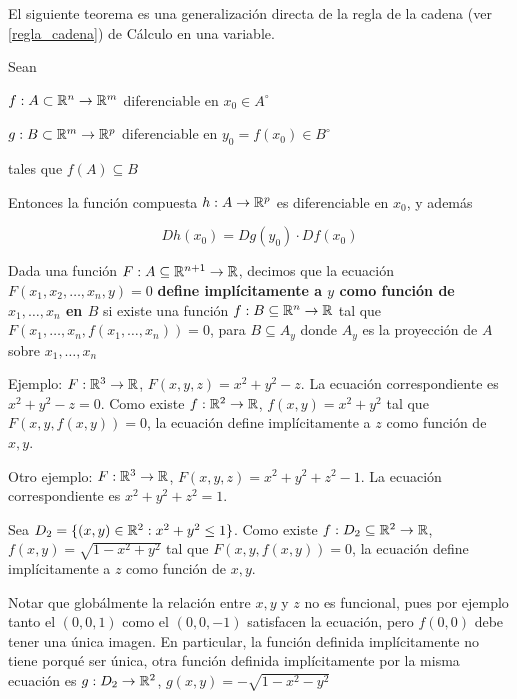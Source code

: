 El siguiente teorema es una generalización directa de la regla de la cadena (ver \ref{regla_cadena}) de Cálculo en una variable.

\begin{theorem} \label{regla_cadena_matricial} 
Sean

$ f : A \subset \mathbb{R}^n \to \mathbb{R}^m$ diferenciable en $x_0 \in A^{\circ}$

$ g : B \subset \mathbb{R}^m \to \mathbb{R}^p$ diferenciable en $y_0 = f(x_0) \in B^{\circ}$

tales que $f(A) \subseteq B$

Entonces la función compuesta $h : A \to \mathbb{R}^p$ es diferenciable en $x_0$, y además 

$$ Dh(x_0) = Dg(y_0) \cdot Df(x_0) $$
\end{theorem}

\begin{definition}
Dada una función $F : A \subseteq \mathbb{R}^{n+1} \to \mathbb{R}$, decimos que la ecuación $F(x_1, x_2, \ldots, x_n, y) = 0$ \textbf{define implícitamente a $y$ como función de $x_1, \ldots, x_n$ en $B$} si existe una función $ f : B \subseteq \mathbb{R}^n \to \mathbb{R}$ tal que $F(x_1, \ldots, x_n, f(x_1, \ldots, x_n)) = 0$, para $B \subseteq A_y$ donde $A_y$ es la proyección de $A$ sobre $x_1, \ldots, x_n$
\end{definition}

Ejemplo: $F: \mathbb{R}^3 \to \mathbb{R}$, $F(x,y,z) = x^2 + y^2 - z$.  La ecuación correspondiente es $x^2 + y^2 - z = 0$. Como existe $f : \mathbb{R}^2 \to \mathbb{R}$, $f(x,y) = x^2 + y^2$ tal que $F(x,y,f(x,y)) = 0$, la ecuación define implícitamente a $z$ como función de $x,y$.

Otro ejemplo: $F: \mathbb{R}^3 \to \mathbb{R}$, $F(x,y,z) = x^2 + y^2 + z^2 - 1$.  La ecuación correspondiente es $x^2 + y^2 + z^2 = 1$. 

Sea $D_2 = \{ (x,y) \in \mathbb{R}^2 : x^2 + y^2 \leq 1 \}$. Como existe $f : D_2 \subseteq \mathbb{R}^2 \to \mathbb{R}$, $f(x,y) = \sqrt{1 - x^2 + y^2}$ tal que $F(x,y,f(x,y)) = 0$, la ecuación define implícitamente a $z$ como función de $x,y$.

Notar que globálmente la relación entre $x,y$ y $z$ no es funcional, pues por ejemplo tanto el $(0,0,1)$ como el $(0,0,-1)$ satisfacen la ecuación, pero $f(0,0)$ debe tener una única imagen.  En particular, la función definida implícitamente no tiene porqué ser única, otra función definida implícitamente por la misma ecuación es $g : D_2 \to \mathbb{R}^2$, $g(x,y) = - \sqrt{1 - x^2 - y^2}$

